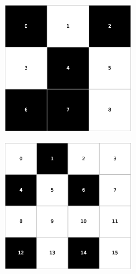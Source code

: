 \begin{figure}[h!]
\begin{subfigure}[b]{\textwidth}
\begin{subfigure}[b]{0.20\textwidth}
        \end{subfigure}
        \hspace{3em}
        \begin{subfigure}[b]{0.20\textwidth}
            \includegraphics[width=\columnwidth]{images/Tai9c_3x3_60.eps}
        \end{subfigure}
     \end{subfigure}
     \caption{Soluzioni delle istanze Tai9c a densità 20\%, 40\% e 60\%}
     \vspace*{1.5cm}
     \begin{subfigure}[b]{\textwidth}
        \centering
        \begin{subfigure}[b]{0.20\textwidth}
            \includegraphics[width=\columnwidth]{images/Tai16c_4x4_30.eps}

\end{subfigure}
\end{subfigure}
\end{figure}
